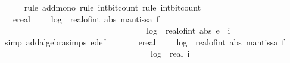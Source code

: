 \begin{isabellebody}
\ \ \ \ \isamarkupfalse%
\ {\isacharparenleft}{\kern0pt}rule\ add{\isacharunderscore}{\kern0pt}mono{\isacharcomma}{\kern0pt}\ rule\ int{\isacharunderscore}{\kern0pt}bit{\isacharunderscore}{\kern0pt}count{\isacharcomma}{\kern0pt}\ rule\ int{\isacharunderscore}{\kern0pt}bit{\isacharunderscore}{\kern0pt}count{\isacharparenright}{\kern0pt}\isanewline
\ \ \isamarkupfalse%
\ \isamarkupfalse%
\ {\isachardoublequoteopen}{\isachardot}{\kern0pt}{\isachardot}{\kern0pt}{\isachardot}{\kern0pt}\ {\isacharequal}{\kern0pt}\ ereal\ {\isacharparenleft}{\kern0pt}{}\ {\isacharplus}{\kern0pt}\ {}\ {\isacharasterisk}{\kern0pt}\ {\isacharparenleft}{\kern0pt}log\ {}\ {\isacharparenleft}{\kern0pt}real{\isacharunderscore}{\kern0pt}of{\isacharunderscore}{\kern0pt}int\ {\isacharparenleft}{\kern0pt}abs\ {\isacharparenleft}{\kern0pt}mantissa\ f{\isacharparenright}{\kern0pt}{\isacharparenright}{\kern0pt}\ {\isacharplus}{\kern0pt}\ {}{\isacharparenright}{\kern0pt}\ {\isacharplus}{\kern0pt}\ \isanewline
\ \ \ \ \ \ \ \ \ \ \ \ \ \ \ \ \ \ \ \ \ \ \ \ \ \ \ \ \ \ \ \ \ \ \ log\ {}\ {\isacharparenleft}{\kern0pt}real{\isacharunderscore}{\kern0pt}of{\isacharunderscore}{\kern0pt}int\ {\isacharparenleft}{\kern0pt}abs\ {\isacharparenleft}{\kern0pt}e\ {\isacharplus}{\kern0pt}\ i{\isacharparenright}{\kern0pt}{\isacharparenright}{\kern0pt}\ {\isacharplus}{\kern0pt}\ {}{\isacharparenright}{\kern0pt}{\isacharparenright}{\kern0pt}{\isacharparenright}{\kern0pt}{\isachardoublequoteclose}\isanewline
\ \ \ \ \isamarkupfalse%
\ {\isacharparenleft}{\kern0pt}simp\ add{\isacharcolon}{\kern0pt}algebra{\isacharunderscore}{\kern0pt}simps\ e{\isacharunderscore}{\kern0pt}def{\isacharparenright}{\kern0pt}\isanewline
\ \ \isamarkupfalse%
\ \isamarkupfalse%
\ {\isachardoublequoteopen}{\isachardot}{\kern0pt}{\isachardot}{\kern0pt}{\isachardot}{\kern0pt}\ {\isasymle}\ ereal\ {\isacharparenleft}{\kern0pt}{}\ {\isacharplus}{\kern0pt}\ {}\ {\isacharasterisk}{\kern0pt}\ {\isacharparenleft}{\kern0pt}log\ {}\ {\isacharparenleft}{\kern0pt}real{\isacharunderscore}{\kern0pt}of{\isacharunderscore}{\kern0pt}int\ {\isacharparenleft}{\kern0pt}abs\ {\isacharparenleft}{\kern0pt}mantissa\ f{\isacharparenright}{\kern0pt}{\isacharparenright}{\kern0pt}\ {\isacharplus}{\kern0pt}\ {}{\isacharparenright}{\kern0pt}\ {\isacharplus}{\kern0pt}\isanewline
\ \ \ \ \ \ \ \ \ \ \ \ \ \ \ \ \ \ \ \ \ \ \ \ \ \ \ \ \ \ \ \ \ \ \ \ log\ {}\ {\isacharparenleft}{\kern0pt}real\ i{\isacharplus}{\kern0pt}{}{\isacharparenright}{\kern0pt}\ {\isacharplus}{\kern0pt}\isanewline

\end{isabellebody}
